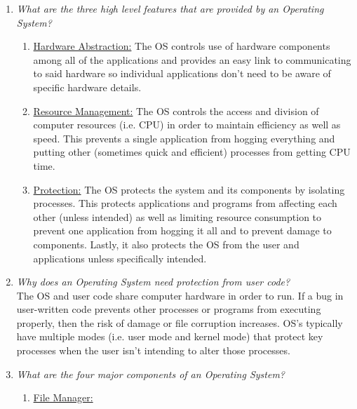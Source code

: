 \documentclass[12pt]{article}
\begin{document}
\renewcommand{\headrulewidth}{0.4pt}
\begin{enumerate}
	\item \textit{What are the three high level features that are provided by an Operating System?}
		\begin{enumerate}
			\item \underline{Hardware Abstraction:} The OS controls use of hardware components among all of the applications and provides an easy link to communicating to said hardware so individual applications don't need to be aware of specific hardware details.
			\item \underline{Resource Management:} The OS controls the access and division of computer resources (i.e. CPU) in order to maintain efficiency as well as speed. This prevents a single application from hogging everything and putting other (sometimes quick and efficient) processes from getting CPU time.
			\item \underline{Protection:} The OS protects the system and its components by isolating processes. This protects applications and programs from affecting each other (unless intended) as well as limiting resource consumption to prevent one application from hogging it all and to prevent damage to components. Lastly, it also protects the OS from the user and applications unless specifically intended.
	    \end{enumerate}
	\item \textit{Why does an Operating System need protection from user code?} \\
	The OS and user code share computer hardware in order to run. If a bug in user-written code prevents other processes or programs from executing properly, then the risk of damage or file corruption increases. OS's typically have multiple modes (i.e. user mode and kernel mode) that protect key processes when the user isn't intending to alter those processes.
	\item \textit{What are the four major components of an Operating System?}
		\begin{enumerate}
			\item \underline{File Manager:} \\

\end{enumerate}
\end{enumerate}
\end{document}
